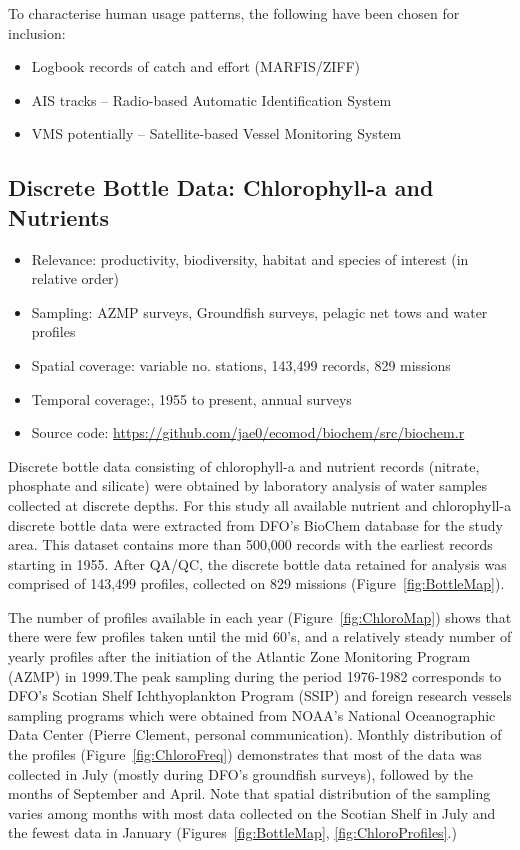 \documentclass[letterpaper,portrait,11pt]{scrartcl}
\numberwithin{equation}{section}		%
\numberwithin{figure}{section}		%
\numberwithin{table}{section}				%
\begin{document}
To characterise human usage patterns, the following have been chosen for inclusion:

\begin{itemize}
	\item Logbook records of catch and effort (MARFIS/ZIFF)
  \item AIS tracks -- Radio-based Automatic Identification System
  \item VMS potentially -- Satellite-based Vessel Monitoring System
\end{itemize}

\subsection{Discrete Bottle Data: Chlorophyll-a and Nutrients}

\begin{itemize}
  \item Relevance: productivity, biodiversity, habitat and species of interest (in relative order)
  \item Sampling: AZMP surveys, Groundfish surveys, pelagic net tows and water profiles
  \item Spatial coverage: variable no. stations, 143,499 records, 829 missions
  \item Temporal coverage:,  1955 to present, annual surveys
  \item Source code: \url{https://github.com/jae0/ecomod/biochem/src/biochem.r}
\end{itemize}

Discrete bottle data consisting of chlorophyll-a and nutrient records (nitrate, phosphate and silicate) were obtained by laboratory analysis of water samples collected at discrete depths. For this study all available nutrient and chlorophyll-a discrete bottle data were extracted from DFO's BioChem database for the study area. This dataset contains more than 500,000 records with the earliest records starting in 1955. After QA/QC, the discrete bottle data retained for analysis was comprised of 143,499 profiles, collected on 829 missions (Figure~\ref{fig:BottleMap}).

The number of profiles available in each year (Figure~\ref{fig:ChloroMap}) shows that there were few profiles taken until the mid 60's, and a relatively steady number of yearly profiles after the initiation of the Atlantic Zone Monitoring Program (AZMP) in 1999.The peak sampling during the period 1976-1982 corresponds to DFO's Scotian Shelf Ichthyoplankton Program (SSIP) and foreign research vessels sampling programs which were obtained from NOAA's National Oceanographic Data Center (Pierre Clement, personal communication).  Monthly distribution of the profiles (Figure~\ref{fig:ChloroFreq})  demonstrates that most of the data was collected in July (mostly during DFO's groundfish surveys), followed by the months of September and April. Note that spatial distribution of the sampling varies among months with most data collected on the Scotian Shelf in July and the fewest data in January (Figures~\ref{fig:BottleMap}, \ref{fig:ChloroProfiles}.)
\end{document}
